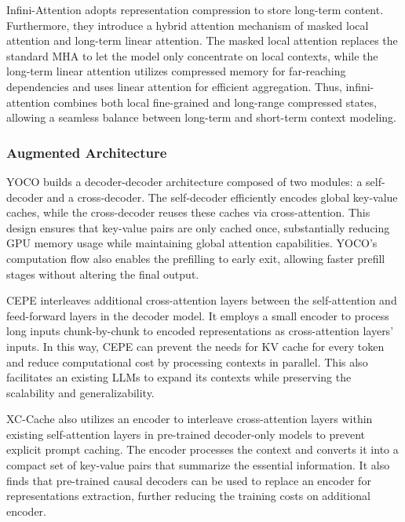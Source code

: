 Infini-Attention \cite{munkhdalaiLeaveNoContext2024} adopts representation compression to store long-term content. Furthermore, they introduce a hybrid attention mechanism of masked local attention and long-term linear attention. The masked local attention replaces the standard MHA to let the model only concentrate on local contexts, while the long-term linear attention utilizes compressed memory for far-reaching dependencies and uses linear attention for efficient aggregation. Thus, infini-attention combines both local fine-grained and long-range compressed states, allowing a seamless balance between long-term and short-term context modeling.

\subsubsection{Augmented Architecture}\label{sec:model_newarch_aug}

YOCO \cite{sunYouOnlyCache2024} builds a decoder-decoder architecture composed of two modules: a self-decoder and a cross-decoder. The self-decoder efficiently encodes global key-value caches, while the cross-decoder reuses these caches via cross-attention. This design ensures that key-value pairs are only cached once, substantially reducing GPU memory usage while maintaining global attention capabilities. YOCO’s computation flow also enables the prefilling to early exit, allowing faster prefill stages without altering the final output.

CEPE \cite{yenLongContextLanguageModeling2024a} interleaves additional cross-attention layers between the self-attention and feed-forward layers in the decoder model. It employs a small encoder to process long inputs chunk-by-chunk to encoded representations as cross-attention layers' inputs. In this way, CEPE can prevent the needs for KV cache for every token and reduce computational cost by processing contexts in parallel. This also facilitates an existing LLMs to expand its contexts while preserving the scalability and generalizability.







XC-Cache \cite{monteiroXCCacheCrossAttendingCached2024} also utilizes an encoder to interleave cross-attention layers within existing self-attention layers in pre-trained decoder-only models to prevent explicit prompt caching. The encoder processes the context and converts it into a compact set of key-value pairs that summarize the essential information. It also finds that pre-trained causal decoders can be used to replace an encoder for representations extraction, further reducing the training costs on additional encoder. 

